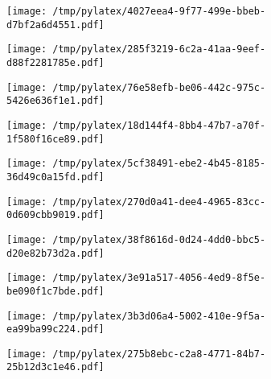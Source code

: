 \documentclass{article}
\begin{document}
\begin{figure}[htbp]
\begin{subfigure}[b]{.3\linewidth}
\texttt{[image: /tmp/pylatex/4027eea4-9f77-499e-bbeb-d7bf2a6d4551.pdf]}
\end{subfigure}
\begin{subfigure}[b]{.3\linewidth}
\texttt{[image: /tmp/pylatex/285f3219-6c2a-41aa-9eef-d88f2281785e.pdf]}
\end{subfigure}
\begin{subfigure}[b]{.3\linewidth}
\texttt{[image: /tmp/pylatex/76e58efb-be06-442c-975c-5426e636f1e1.pdf]}
\end{subfigure}
\begin{subfigure}[b]{.3\linewidth}
\texttt{[image: /tmp/pylatex/18d144f4-8bb4-47b7-a70f-1f580f16ce89.pdf]}
\end{subfigure}
\begin{subfigure}[b]{.3\linewidth}
\texttt{[image: /tmp/pylatex/5cf38491-ebe2-4b45-8185-36d49c0a15fd.pdf]}
\end{subfigure}
\begin{subfigure}[b]{.3\linewidth}
\texttt{[image: /tmp/pylatex/270d0a41-dee4-4965-83cc-0d609cbb9019.pdf]}
\end{subfigure}
\begin{subfigure}[b]{.3\linewidth}
\texttt{[image: /tmp/pylatex/38f8616d-0d24-4dd0-bbc5-d20e82b73d2a.pdf]}
\end{subfigure}
\begin{subfigure}[b]{.3\linewidth}
\texttt{[image: /tmp/pylatex/3e91a517-4056-4ed9-8f5e-be090f1c7bde.pdf]}
\end{subfigure}
\begin{subfigure}[b]{.3\linewidth}
\texttt{[image: /tmp/pylatex/3b3d06a4-5002-410e-9f5a-ea99ba99c224.pdf]}
\end{subfigure}
\begin{subfigure}[b]{.3\linewidth}
\texttt{[image: /tmp/pylatex/275b8ebc-c2a8-4771-84b7-25b12d3c1e46.pdf]}
\end{subfigure}
\end{figure}
\end{document}
